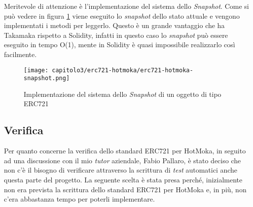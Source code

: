 
Meritevole di attenzione è l'implementazione del sistema dello \textit{Snapshot}. Come si può vedere in figura \ref{fig:erc721-snapshot} viene eseguito lo \textit{snapshot} dello stato attuale e vengono implementati i metodi per leggerlo. Questo è un grande vantaggio che ha Takamaka rispetto a Solidity, infatti in questo caso lo \textit{snapshot} può essere eseguito in tempo O(1), mente in Solidity è quasi impossibile realizzarlo così facilmente.

\begin{figure}[h!]
  \centering
  \texttt{[image: capitolo3/erc721-hotmoka/erc721-hotmoka-snapshot.png]}
  \caption{Implementazione del sistema dello \textit{Snapshot} di un oggetto di tipo ERC721}
  \label{fig:erc721-snapshot}
\end{figure}


\subsection{Verifica}
Per quanto concerne la verifica dello standard ERC721 per HotMoka, in seguito ad una discussione con il mio \textit{tutor} aziendale, Fabio Pallaro, è stato deciso che non c'è il bisogno di verificare attraverso la scrittura di \textit{test} automatici anche questa parte del progetto. La seguente scelta è stata presa perché, inizialmente non era prevista la scrittura dello standard ERC721 per HotMoka e, in più, non c'era abbastanza tempo per poterli implementare.
